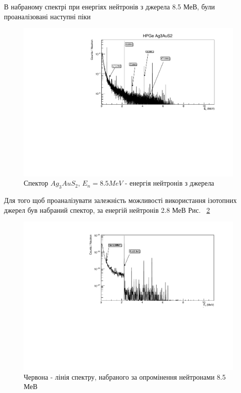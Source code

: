 \documentclass[a4paper, 14pt]{article}
\numberwithin{equation}{section}
\numberwithin{table}{section}
\begin{document}
	В набраному спектрі при енергіях нейтронів з джерела 8.5 МеВ, були проаналізовані наступні піки
	\begin{figure}[hbt!]
		\centering \includegraphics[width=1\textwidth]{res/Au_AnzSpectr.pdf}
		\caption{Спектор $Ag_3AuS_2$, $E_{n} = 8.5 MeV$ - енергія нейтронів з джерела}
		\label{ris:Ag3AuS28_5MeVPick}	
	\end{figure} 
	Для того щоб проаналізувати залежність можливості використання ізотопних джерел був набраний спектор, за енергій нейтронів 2.8 МеВ Рис. ~\ref{ris:Ag3AuS22_8MeV}
	\begin{figure}[hbt!]
		\centering \includegraphics[width=1\textwidth]{res/AuAgS28MeV.pdf}
		\caption{Червона - лінія спектру, набраного за опромінення нейтронами 8.5 МеВ}
		\label{ris:Ag3AuS22_8MeV}	
	\end{figure} 
\end{document}
